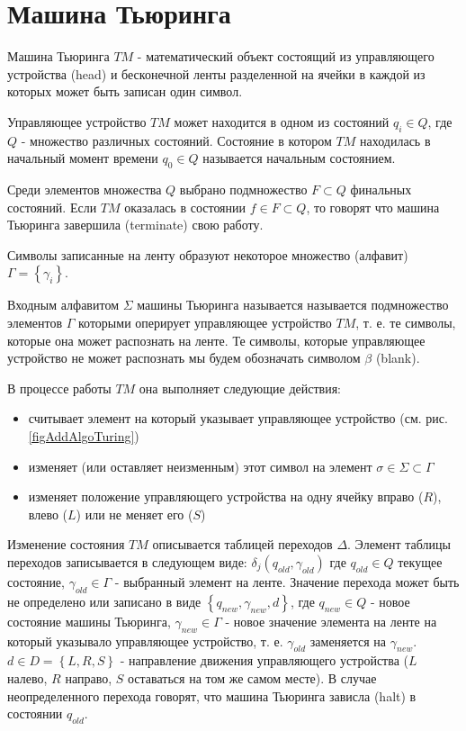 \section{Машина Тьюринга}
\label{addTuring}

Машина Тьюринга $TM$ - математический объект состоящий из
управляющего устройства (head) и бесконечной ленты разделенной на
ячейки в каждой из которых может быть записан один символ.



Управляющее устройство $TM$ может находится в одном из состояний $q_i
\in Q$, где $Q$ 
- множество различных состояний. Состояние в котором $TM$ находилась в
начальный момент времени $q_0 \in Q$ называется начальным состоянием. 

Среди элементов множества $Q$ выбрано подмножество $F \subset Q$
финальных состояний. Если $TM$ оказалась в состоянии $f \in F \subset
Q$, то говорят что машина Тьюринга завершила (terminate) свою работу.

Символы записанные на ленту образуют некоторое множество (алфавит)
$\Gamma = \left\{\gamma_i\right\}$.

Входным алфавитом $\Sigma$ машины Тьюринга называется называется
подмножество элементов $\Gamma$ которыми оперирует управляющее устройство $TM$,
т. е. те символы, которые она может распознать на ленте. Те символы,
которые управляющее устройство не может распознать мы будем обозначать символом
$\beta$ (blank).

В процессе работы $TM$ она выполняет следующие действия:
\begin{itemize}
\item{считывает элемент на который указывает управляющее устройство
  (см. рис. \ref{figAddAlgoTuring})}
\item{изменяет (или оставляет неизменным) этот символ на элемент
  $\sigma \in \Sigma \subset \Gamma$}
\item{изменяет положение управляющего устройства на одну ячейку вправо
  ($R$), влево ($L$) или не меняет его ($S$)}
\end{itemize}

Изменение состояния $TM$ описывается таблицей переходов
$\Delta$. Элемент таблицы переходов записывается в следующем виде: 
$\delta_j\left(q_{old}, \gamma_{old}\right)$ где $q_{old} \in Q$ текущее состояние,
$\gamma_{old} \in \Gamma$ - выбранный элемент на ленте. Значение
перехода может быть 
не определено или записано в виде $\left\{q_{new}, \gamma_{new}, d\right\}$, где
$q_{new} \in Q$ - новое состояние машины Тьюринга, $\gamma_{new} \in \Gamma$ -
новое значение элемента на ленте на который указывало управляющее устройство,
т. е. $\gamma_{old}$ заменяется на $\gamma_{new}$. $d \in D =
\left\{L, R, S\right\}$ - направление
движения управляющего устройства ($L$ налево, $R$ направо, $S$
оставаться на том же самом месте). В случае неопределенного
перехода говорят, что машина Тьюринга зависла (halt) в состоянии $q_{old}$.



